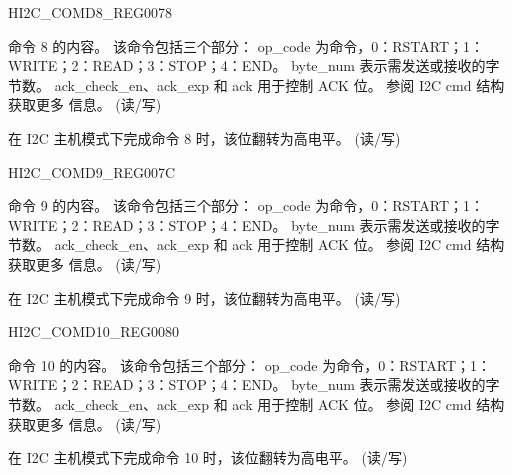 \begin{register}{H}{I2C\_COMD8\_REG}{\hexprefix{}0078}\label{regdesc:I2CCOMD8REG}
%
%
%
\regnewline%
\begin{regdesc}\begin{reglist}
\label{fielddesc:I2CCOMMAND8}\item [I2C\_COMMAND8] 命令 8 的内容。 该命令包括三个部分：
op\_code 为命令，0：RSTART；1：WRITE；2：READ；3：STOP；4：END。
byte\_num 表示需发送或接收的字节数。
ack\_check\_en、ack\_exp 和 ack 用于控制 ACK 位。 参阅 I2C cmd 结构获取更多
信息。 (读/写)
\label{fielddesc:I2CCOMMAND8DONE}\item [I2C\_COMMAND8\_DONE] 在 I2C 主机模式下完成命令 8 时，该位翻转为高电平。 (读/写)
\end{reglist}\end{regdesc}
\end{register}


\begin{register}{H}{I2C\_COMD9\_REG}{\hexprefix{}007C}\label{regdesc:I2CCOMD9REG}
%
%
%
\regnewline%
\begin{regdesc}\begin{reglist}
\label{fielddesc:I2CCOMMAND9}\item [I2C\_COMMAND9] 命令 9 的内容。 该命令包括三个部分：
op\_code 为命令，0：RSTART；1：WRITE；2：READ；3：STOP；4：END。
byte\_num 表示需发送或接收的字节数。
ack\_check\_en、ack\_exp 和 ack 用于控制 ACK 位。 参阅 I2C cmd 结构获取更多
信息。 (读/写)
\label{fielddesc:I2CCOMMAND9DONE}\item [I2C\_COMMAND9\_DONE] 在 I2C 主机模式下完成命令 9 时，该位翻转为高电平。 (读/写)
\end{reglist}\end{regdesc}
\end{register}


\begin{register}{H}{I2C\_COMD10\_REG}{\hexprefix{}0080}\label{regdesc:I2CCOMD10REG}
%
%
%
\regnewline%
\begin{regdesc}\begin{reglist}
\label{fielddesc:I2CCOMMAND10}\item [I2C\_COMMAND10] 命令 10 的内容。 该命令包括三个部分：
op\_code 为命令，0：RSTART；1：WRITE；2：READ；3：STOP；4：END。
byte\_num 表示需发送或接收的字节数。
ack\_check\_en、ack\_exp 和 ack 用于控制 ACK 位。 参阅 I2C cmd 结构获取更多
信息。 (读/写)
\label{fielddesc:I2CCOMMAND10DONE}\item [I2C\_COMMAND10\_DONE] 在 I2C 主机模式下完成命令 10 时，该位翻转为高电平。 (读/写)
\end{reglist}\end{regdesc}
\end{register}


